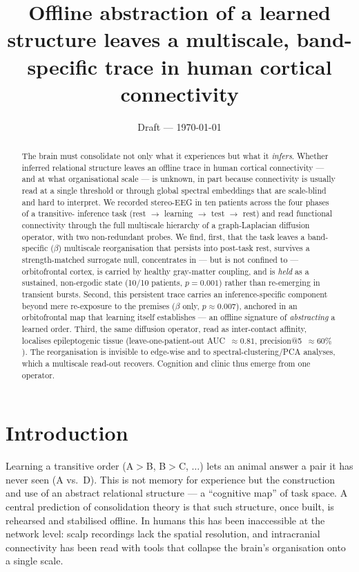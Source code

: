 \documentclass[11pt]{article}
\title{Offline abstraction of a learned structure leaves a multiscale,
band-specific trace in human cortical connectivity}
\author{\TODO{author list}}
\date{Draft --- \today}
\begin{document}
\maketitle

\begin{abstract}
\noindent
The brain must consolidate not only what it experiences but what it
\emph{infers}. Whether inferred relational structure leaves an offline trace in
human cortical connectivity --- and at what organisational scale --- is unknown,
in part because connectivity is usually read at a single threshold or through
global spectral embeddings that are scale-blind and hard to interpret. We
recorded stereo-EEG in ten patients across the four phases of a transitive-
inference task (rest $\rightarrow$ learning $\rightarrow$ test $\rightarrow$ rest)
and read functional connectivity through the full multiscale hierarchy of a
graph-Laplacian diffusion operator, with two non-redundant probes. We find,
first, that the task leaves a band-specific ($\beta$) multiscale reorganisation
that persists into post-task rest, survives a strength-matched surrogate null,
concentrates in --- but is not confined to --- orbitofrontal cortex, is carried
by healthy gray-matter coupling, and is \emph{held} as a sustained, non-ergodic
state (10/10 patients, $p=0.001$) rather than re-emerging in transient bursts.
Second, this persistent trace carries an inference-specific component beyond mere
re-exposure to the premises ($\beta$ only, $p\approx0.007$), anchored in an
orbitofrontal map that
learning itself establishes --- an offline signature of \emph{abstracting} a
learned order. Third, the same diffusion operator, read as inter-contact
affinity, localises epileptogenic tissue (leave-one-patient-out
AUC~$\approx0.81$, precision@5~$\approx60\%$). The reorganisation is invisible to
edge-wise and to spectral-clustering/PCA analyses, which a multiscale read-out
recovers. Cognition and clinic thus emerge from one operator.
\end{abstract}

\section{Introduction}

Learning a transitive order (A$>$B, B$>$C, $\dots$) lets an animal answer a pair
it has never seen (A vs.\ D). This is not memory for experience but the
construction and use of an abstract relational structure --- a ``cognitive
map'' of task space. A central prediction of consolidation theory is that such
structure, once built, is rehearsed and stabilised offline. In humans this has
been inaccessible at the network level: scalp recordings lack the spatial
resolution, and intracranial connectivity has been read with tools that collapse
the brain's organisation onto a single scale.
\end{document}
